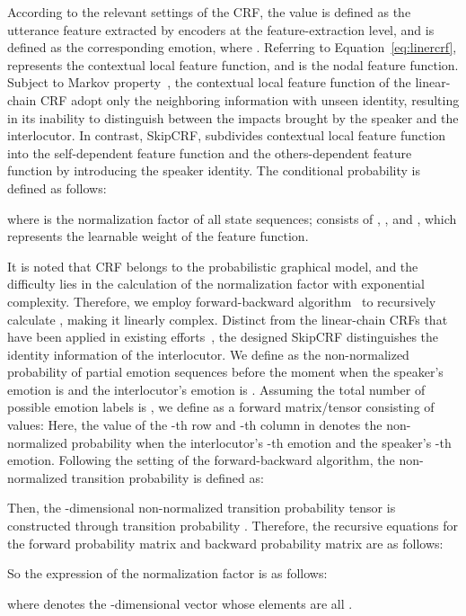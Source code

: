 \documentclass{SCIS2019}
\begin{document}
According to the relevant settings of the CRF, the value  is defined as the utterance feature extracted by encoders at the feature-extraction level, and  is defined as the corresponding emotion, where . Referring to Equation~\ref{eq:linercrf},  represents the contextual local feature function, and  is the nodal feature function. Subject to Markov property~\cite{lafferty2001,MAL-013}, the contextual local feature function  of the linear-chain CRF adopt only the neighboring information with unseen identity, resulting in its inability to distinguish between the impacts brought by the speaker and the interlocutor. In contrast, SkipCRF, subdivides contextual local feature function  into the self-dependent feature function  and the others-dependent feature function  by introducing the speaker identity. The conditional probability  is defined as follows: 

where  is the normalization factor of all state sequences;  consists of , , and , which represents the learnable weight of the feature function.

It is noted that CRF belongs to the probabilistic graphical model, and the difficulty lies in the calculation of the normalization factor with exponential complexity. Therefore, we employ forward-backward algorithm~\cite{binder1997space} to recursively calculate , making it linearly complex. Distinct from the linear-chain CRFs that have been applied in existing efforts~\cite{wang2020contextualized,song2022emotionflow,liang2021s+}, the designed SkipCRF distinguishes the identity information of the interlocutor. 
We define  as the non-normalized probability of partial emotion sequences before the moment  when the speaker's emotion is  and the interlocutor's emotion is . Assuming the total number of possible emotion labels is , we define  as a forward matrix/tensor consisting of  values:  
Here, the value of the -th row and -th column in  denotes the non-normalized probability when the interlocutor's -th emotion and the speaker's -th emotion. Following the setting of the forward-backward algorithm, the non-normalized transition probability  is defined as:

Then, the -dimensional non-normalized transition probability tensor  is constructed through transition probability . Therefore, the recursive equations for the forward probability matrix  and backward probability matrix  are as follows:

So the expression of the normalization factor  is as follows: 

where  denotes the -dimensional vector whose elements are all .
\end{document}
